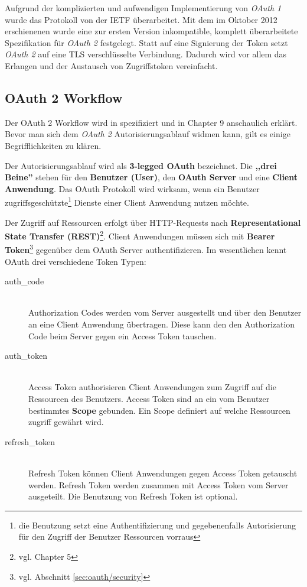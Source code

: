 \documentclass[12pt,a4paper,pointednumbers,abstracton]{scrartcl}
\begin{document}
Aufgrund der komplizierten und aufwendigen Implementierung von \emph{OAuth 1} wurde das Protokoll von der IETF überarbeitet.
Mit dem im Oktober 2012 erschienenen \cite{RFC5849} wurde eine zur ersten Version inkompatible, komplett überarbeitete Spezifikation für \emph{OAuth 2} festgelegt. Statt auf eine Signierung der Token setzt \emph{OAuth 2} auf eine TLS verschlüsselte Verbindung.
Dadurch wird vor allem das Erlangen und der Austausch von Zugriffstoken vereinfacht.

\subsection{OAuth 2 Workflow}

Der OAuth 2 Workflow wird in \cite{RFC5849} spezifiziert und in \cite{LeBlanc2011} Chapter 9 anschaulich erklärt.
Bevor man sich dem \emph{OAuth 2} Autorisierungsablauf widmen kann, gilt es einige Begrifflichkeiten zu klären.

Der Autorisierungsablauf wird als \textbf{3-legged OAuth} bezeichnet.
Die \textbf{,,drei Beine''} stehen für den \textbf{Benutzer (User)}, den \textbf{OAuth Server} und eine \textbf{Client Anwendung}.
Das OAuth Protokoll wird wirksam, wenn ein Benutzer zugriffsgeschützte\footnote{die Benutzung setzt eine Authentifizierung und gegebenenfalls Autorisierung für den Zugriff der Benutzer Ressourcen vorraus} Dienste einer Client Anwendung nutzen möchte.

Der Zugriff auf Ressourcen erfolgt über HTTP-Requests nach \textbf{Representational State Transfer (REST)}\footnote{vgl. \cite{Fie2000} Chapter 5}.
Client Anwendungen müssen sich mit \textbf{Bearer Token}\footnote{vgl. Abschnitt \ref{sec:oauth/security}} gegenüber dem OAuth Server authentifizieren.
Im wesentlichen kennt OAuth drei verschiedene Token Typen:

\begin{description}
	\item[auth\_code] \hfill \\
		Authorization Codes werden vom Server ausgestellt und über den Benutzer an eine Client Anwendung übertragen.
		Diese kann den den Authorization Code beim Server gegen ein Access Token tauschen.
	\item[auth\_token] \hfill \\
		Access Token authorisieren Client Anwendungen zum Zugriff auf die Ressourcen des Benutzers.
		Access Token sind an ein vom Benutzer bestimmtes \textbf{Scope} gebunden.
		Ein Scope definiert auf welche Ressourcen zugriff gewährt wird.
	\item[refresh\_token] \hfill \\
		Refresh Token können Client Anwendungen gegen Access Token getauscht werden.
		Refresh Token werden zusammen mit Access Token vom Server ausgeteilt.
		Die Benutzung von Refresh Token ist optional.
\end{description}
\end{document}
